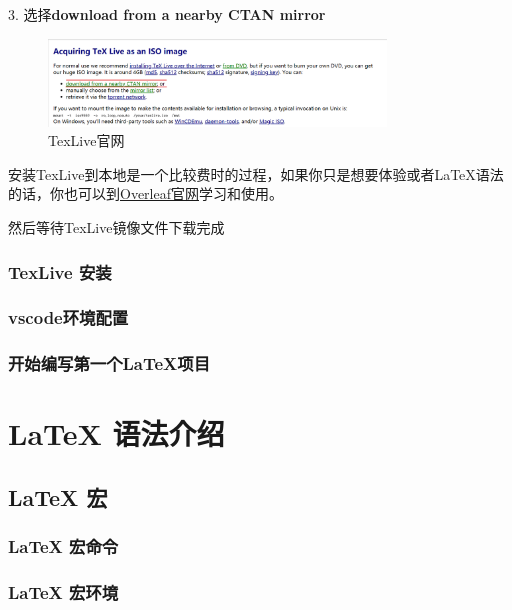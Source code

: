 \documentclass[cn,10pt,math=newtx,citestyle=gb7714-2015,bibstyle=gb7714-2015]{elegantbook}
\begin{document}
    3. 选择\textbf{download from a nearby CTAN mirror}

    \begin{figure}[H]
        \centering
        \includegraphics[width=0.8\textwidth]{images/shapshot_install_3.png}
        \caption{TexLive官网}
        \label{shapshot_install_3}
    \end{figure}

    \begin{note}
        安装TexLive到本地是一个比较费时的过程，如果你只是想要体验或者\LaTeX{}语法的话，你也可以到\href{https://www.overleaf.com/}{Overleaf官网}学习和使用。
    \end{note}

    然后等待TexLive镜像文件下载完成
                                     
    \subsection{TexLive 安装}

    \subsection{vscode环境配置}

    \subsection{开始编写第一个\LaTeX{}项目}

    \chapter{\LaTeX{} 语法介绍}

    \section{\LaTeX{} 宏}

    \subsection{\LaTeX{} 宏命令}

    \subsection{\LaTeX{} 宏环境}
\end{document}
